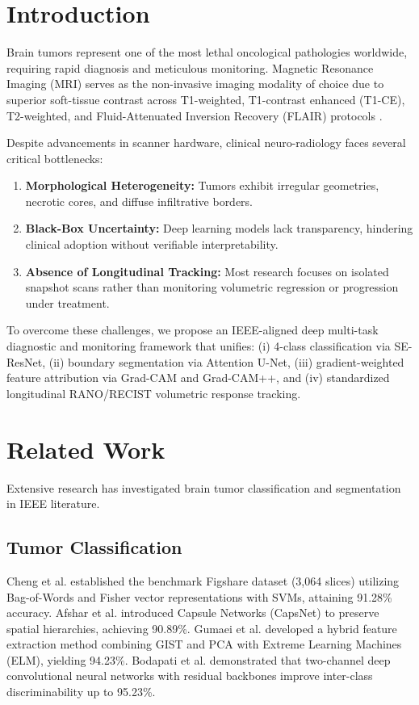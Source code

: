 \documentclass[conference]{IEEEtran}
\begin{document}
\section{Introduction}
Brain tumors represent one of the most lethal oncological pathologies worldwide, requiring rapid diagnosis and meticulous monitoring. Magnetic Resonance Imaging (MRI) serves as the non-invasive imaging modality of choice due to superior soft-tissue contrast across T1-weighted, T1-contrast enhanced (T1-CE), T2-weighted, and Fluid-Attenuated Inversion Recovery (FLAIR) protocols \cite{cheng2015retrieval}.

Despite advancements in scanner hardware, clinical neuro-radiology faces several critical bottlenecks:
\begin{enumerate}
    \item \textbf{Morphological Heterogeneity:} Tumors exhibit irregular geometries, necrotic cores, and diffuse infiltrative borders.
    \item \textbf{Black-Box Uncertainty:} Deep learning models lack transparency, hindering clinical adoption without verifiable interpretability.
    \item \textbf{Absence of Longitudinal Tracking:} Most research focuses on isolated snapshot scans rather than monitoring volumetric regression or progression under treatment.
\end{enumerate}

To overcome these challenges, we propose an IEEE-aligned deep multi-task diagnostic and monitoring framework that unifies: (i) 4-class classification via SE-ResNet, (ii) boundary segmentation via Attention U-Net, (iii) gradient-weighted feature attribution via Grad-CAM and Grad-CAM++, and (iv) standardized longitudinal RANO/RECIST volumetric response tracking.

\section{Related Work}
Extensive research has investigated brain tumor classification and segmentation in IEEE literature.

\subsection{Tumor Classification}
Cheng et al. \cite{cheng2015retrieval} established the benchmark Figshare dataset (3,064 slices) utilizing Bag-of-Words and Fisher vector representations with SVMs, attaining 91.28\% accuracy. Afshar et al. \cite{afshar2018brain} introduced Capsule Networks (CapsNet) to preserve spatial hierarchies, achieving 90.89\%. Gumaei et al. \cite{gumaei2019novel} developed a hybrid feature extraction method combining GIST and PCA with Extreme Learning Machines (ELM), yielding 94.23\%. Bodapati et al. \cite{bodapati2021brain} demonstrated that two-channel deep convolutional neural networks with residual backbones improve inter-class discriminability up to 95.23\%.
\end{document}
